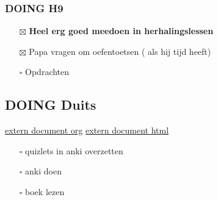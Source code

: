 \documentclass[11pt]{article}
\begin{document}
\subsubsection{{\bfseries\sffamily DOING} H9}
\label{sec:org3384129}
\begin{itemize}
\item[{$\boxtimes$}] \textbf{Heel erg goed meedoen in herhalingslessen}
\item[{$\boxtimes$}] Papa vragen om oefentoetsen ( als hij tijd heeft)
\item[{$\square$}] Opdrachten
\end{itemize}
\subsection{{\bfseries\sffamily DOING} Duits}
\label{sec:org55e2e85}
\href{file:///home/mrhappy200/werk/2023/Duits/PWW3/notities.org}{extern document org}
\href{http://localhost:8000/Duits/PWW3/notities.html}{extern document html}
\begin{itemize}
\item[{$\square$}] quizlets in anki overzetten
\item[{$\square$}] anki doen
\item[{$\square$}] boek lezen
\end{itemize}
\end{document}
